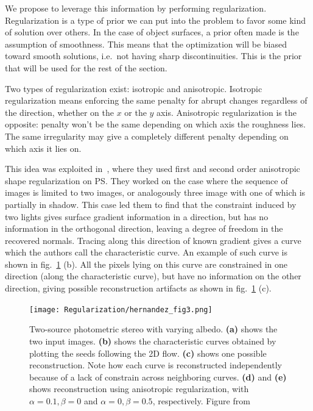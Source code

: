 We propose to leverage this information by performing regularization. Regularization is a type of prior we can put into the problem to favor some kind of solution over others. In the case of object surfaces, a prior often made is the assumption of smoothness. This means that the optimization will be biased toward smooth solutions, i.e.\ not having sharp discontinuities. This is the prior that will be used for the rest of the section.

Two types of regularization exist: isotropic and anisotropic. Isotropic regularization means enforcing the same penalty for abrupt changes regardless of the direction, whether on the $x$ or the $y$ axis. Anisotropic regularization is the opposite: penalty won't be the same depending on which axis the roughness lies. The same irregularity may give a completely different penalty depending on which axis it lies on.

This idea was exploited in~\cite{hernandez-pami-11}, where they used first and second order anisotropic shape regularization on PS. They worked on the case where the sequence of images is limited to two images, or analogously three image with one of which is partially in shadow. This case led them to find that the constraint induced by two lights gives surface gradient information in a direction, but has no information in the orthogonal direction, leaving a degree of freedom in the recovered normals. Tracing along this direction of known gradient gives a curve which the authors call the characteristic curve. An example of such curve is shown in fig.~\ref{fig:reg-her3} (b). All the pixels lying on this curve are constrained in one direction (along the characteristic curve), but have no information on the other direction, giving possible reconstruction artifacts as shown in fig.~\ref{fig:reg-her3} (c).

\begin{figure}
\centering
\texttt{[image: Regularization/hernandez\_fig3.png]}
\caption{Two-source photometric stereo with varying albedo. \textbf{(a)} shows the two input images. \textbf{(b)} shows the characteristic curves obtained by plotting the seeds following the 2D flow. \textbf{(c)} shows one possible reconstruction. Note how each curve is reconstructed independently because of a lack of constrain across neighboring curves. \textbf{(d)} and \textbf{(e)} shows reconstruction using anisotropic regularization, with $\alpha = 0.1, \beta = 0$ and $\alpha = 0, \beta = 0.5$, respectively. Figure from~\cite{hernandez-pami-11}}
\label{fig:reg-her3}
\end{figure}

